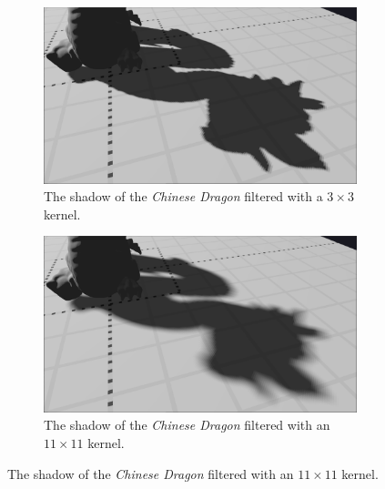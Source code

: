 \begin{figure}[p]
    \centering
    \begin{subfigure}[t]{0.48\textwidth}
		\centering
        \includegraphics[width=\textwidth]{./graf/tests/pcf/cropped/dragon_pcf_fhd_1024_3x3.png}
        \caption{The shadow of the \textit{Chinese Dragon} filtered with a \(3\times 3\) kernel.}
    \end{subfigure}
	\hfill
    \begin{subfigure}[t]{0.48\textwidth}
		\centering
        \includegraphics[width=\textwidth]{./graf/tests/pcf/cropped/dragon_pcf_fhd_1024_11x11.png}
        \caption{The shadow of the \textit{Chinese Dragon} filtered with an \(11\times 11\) kernel.}
    \end{subfigure}


\end{figure}
